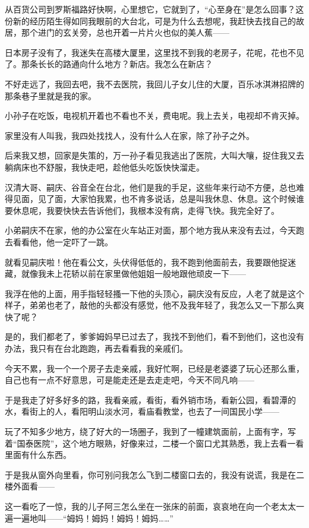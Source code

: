 \par 从百货公司到罗斯福路好快啊，心里想它，它就到了，“心至身在”是怎么回事？这份新的经历陌生得如同我眼前的大台北，可是为什么去想呢，我赶快去找自己的故居，那个进门的玄关旁，总也开着一片片火也似的美人蕉——
\par 日本房子没有了，我迷失在高楼大厦里，这里找不到我的老房子，花呢，花也不见了。那条长长的路通向什么地方？新店。我怎么在新店？
\par 不好走远了，我回去吧，我不去医院，我回儿子女儿住的大厦，百乐冰淇淋招牌的那条巷子里就是我的家。
\par 小孙子在吃饭，电视机开着也不看也不关，费电呢。我上去关，电视却不肯灭掉。
\par 家里没有人叫我，我四处找找人，没有什么人在家，除了孙子之外。
\par 后来我又想，回家是失策的，万一孙子看见我逃出了医院，大叫大嚷，捉住我又去躺病床也不舒服，我快走吧，趁他低头吃饭快快溜走。
\par 汉清大哥、嗣庆、谷音全在台北，他们是我的手足，这些年来行动不方便，总也难得见面，见了面，大家怕我累，也不肯多说话，总是叫我休息、休息。这个时候谁要休息呢，我要快快去告诉他们，我根本没有病，走得飞快。我完全好了。
\par 小弟嗣庆不在家，他的办公室在火车站正对面，那个地方我从来没有去过，今天跑去看看他，他一定吓了一跳。
\par 就看见嗣庆啦！他在看公文，头伏得低低的，我不跑到他面前去，我要跟他捉迷藏，就像我未上花轿以前在家里做他姐姐一般地跟他顽皮一下——
\par 我浮在他的上面，用手指轻轻搔一下他的头顶心，嗣庆没有反应，人老了就是这个样子，弟弟也老了，敲他的头都没有感觉，他不及我年轻了，我怎么又一下那么爽快了呢？
\par 是的，我们都老了，爹爹姆妈早已过去了，我找不到他们，看不到他们，这也没有办法，我只有在台北跑跑，再去看看我的亲戚们。
\par 今天不累，我一个一个房子去走亲戚，我好忙啊，已经是老婆婆了玩心还那么重，自己也有一点不好意思，可是能走还是去走走吧，今天不同凡响——
\par 于是我走了好多好多的路，我看亲戚，看街，看外销市场，看新公园，看碧潭的水，看街上的人，看阳明山淡水河，看庙看教堂，也去了一间国民小学——
\par 玩了不知多少地方，绕了好大的一场圈子，我到了一幢建筑面前，上面有字，写着“国泰医院”，这个地方眼熟，好像来过，二楼一个窗口尤其熟悉，我上去看一看里面有什么东西。
\par 于是我从窗外向里看，你可别问我怎么飞到二楼窗口去的，我没有说谎，我是在二楼外面看——
\par 这一看吃了一惊，我的儿子阿三怎么坐在一张床的前面，哀哀地在向一个老太太一遍一遍地叫——“姆妈！姆妈！姆妈！姆妈……”
